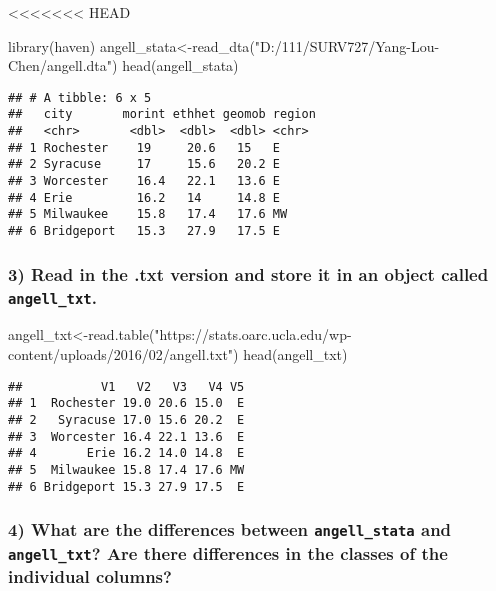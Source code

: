 \documentclass[
  12pt,
]{article}
\newenvironment{Shaded}{\begin{snugshade}}{\end{snugshade}}
\newcommand{\FunctionTok}[1]{\textcolor[rgb]{0.00,0.00,0.00}{#1}}
\newcommand{\NormalTok}[1]{#1}
\newcommand{\OtherTok}[1]{\textcolor[rgb]{0.56,0.35,0.01}{#1}}
\newcommand{\StringTok}[1]{\textcolor[rgb]{0.31,0.60,0.02}{#1}}
\begin{document}
\textless\textless\textless\textless\textless\textless\textless{} HEAD

\begin{Shaded}
\begin{Highlighting}[]
\FunctionTok{library}\NormalTok{(haven)}
\NormalTok{angell\_stata}\OtherTok{\textless{}{-}}\FunctionTok{read\_dta}\NormalTok{(}\StringTok{"D:/111/SURV727/Yang{-}Lou{-}Chen/angell.dta"}\NormalTok{)}
\FunctionTok{head}\NormalTok{(angell\_stata)}
\end{Highlighting}
\end{Shaded}

\begin{verbatim}
## # A tibble: 6 x 5
##   city       morint ethhet geomob region
##   <chr>       <dbl>  <dbl>  <dbl> <chr> 
## 1 Rochester    19     20.6   15   E     
## 2 Syracuse     17     15.6   20.2 E     
## 3 Worcester    16.4   22.1   13.6 E     
## 4 Erie         16.2   14     14.8 E     
## 5 Milwaukee    15.8   17.4   17.6 MW    
## 6 Bridgeport   15.3   27.9   17.5 E
\end{verbatim}

\hypertarget{read-in-the-.txt-version-and-store-it-in-an-object-called-angell_txt.}{%
\subsubsection{\texorpdfstring{3) Read in the .txt version and store it
in an object called
\texttt{angell\_txt}.}{3) Read in the .txt version and store it in an object called angell\_txt.}}\label{read-in-the-.txt-version-and-store-it-in-an-object-called-angell_txt.}}

\begin{Shaded}
\begin{Highlighting}[]
\NormalTok{angell\_txt}\OtherTok{\textless{}{-}}\FunctionTok{read.table}\NormalTok{(}\StringTok{"https://stats.oarc.ucla.edu/wp{-}content/uploads/2016/02/angell.txt"}\NormalTok{)}
\FunctionTok{head}\NormalTok{(angell\_txt)}
\end{Highlighting}
\end{Shaded}

\begin{verbatim}
##           V1   V2   V3   V4 V5
## 1  Rochester 19.0 20.6 15.0  E
## 2   Syracuse 17.0 15.6 20.2  E
## 3  Worcester 16.4 22.1 13.6  E
## 4       Erie 16.2 14.0 14.8  E
## 5  Milwaukee 15.8 17.4 17.6 MW
## 6 Bridgeport 15.3 27.9 17.5  E
\end{verbatim}

\hypertarget{what-are-the-differences-between-angell_stata-and-angell_txt-are-there-differences-in-the-classes-of-the-individual-columns}{%
\subsubsection{\texorpdfstring{4) What are the differences between
\texttt{angell\_stata} and \texttt{angell\_txt}? Are there differences
in the classes of the individual
columns?}{4) What are the differences between angell\_stata and angell\_txt? Are there differences in the classes of the individual columns?}}\label{what-are-the-differences-between-angell_stata-and-angell_txt-are-there-differences-in-the-classes-of-the-individual-columns}}
\end{document}
